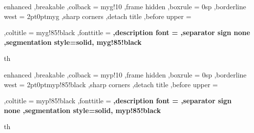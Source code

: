 
\makeatletter
{}
\makeatother



{%
	enhanced
	,breakable
	,colback = myg!10
	,frame hidden
	,boxrule = 0sp
	,borderline west = {2pt}{0pt}{myg}
	,sharp corners
	,detach title
	,before upper = \tcbtitle\par\smallskip
	,coltitle = myg!85!black
	,fonttitle = \bfseries\sffamily
	,description font = \mdseries
	,separator sign none
	,segmentation style={solid, myg!85!black}
}
{th}

{%
	enhanced
	,breakable
	,colback = myp!10
	,frame hidden
	,boxrule = 0sp
	,borderline west = {2pt}{0pt}{myp!85!black}
	,sharp corners
	,detach title
	,before upper = \tcbtitle\par\smallskip
	,coltitle = myp!85!black
	,fonttitle = \bfseries\sffamily
	,description font = \mdseries
	,separator sign none
	,segmentation style={solid, myp!85!black}
}
{th}



\newcommand{\ex}[2]{\begin{Example}{#1}{}#2\end{Example}}
\newcommand{\dfn}[2]{\begin{Definition}[colbacktitle=red!75!black]{#1}{}#2\end{Definition}}
\newcommand{\nt}[1]{\begin{note}#1\end{note}}
\newcommand{\qs}[2]{\begin{question}{#1}{}#2\end{question}}
\newcommand{\basicprf}[3]{\begin{basicproof}{#1}{#2}#3\end{basicproof}}
\newcommand{\terminology}[2]{\begin{Terminology}{#1}{}#2\end{Terminology}}


